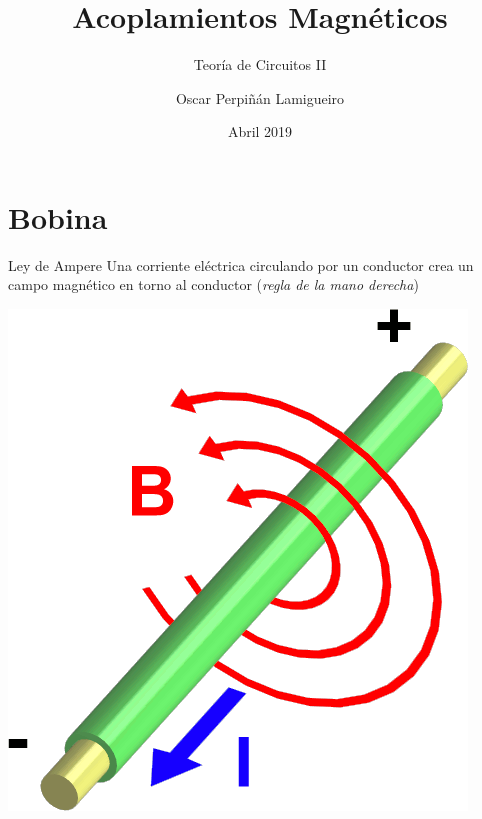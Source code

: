 \documentclass[xcolor={usenames,svgnames,dvipsnames}]{beamer}
\author{Oscar Perpiñán Lamigueiro}
\date{Abril 2019}
\title{Acoplamientos Magnéticos}
\subtitle{Teoría de Circuitos II}
\begin{document}
\maketitle

\section{Bobina}
\label{sec:org1fdc5e0}

\begin{frame}[label={sec:orge4ab99d}]{Ley de Ampere}
Una corriente eléctrica circulando por un conductor crea un campo magnético en torno al conductor (\emph{regla de la mano derecha})

\begin{center}
\includegraphics[height=0.7\textheight]{figs/Electromagnetism.png}
\end{center}
\end{frame}
\end{document}
